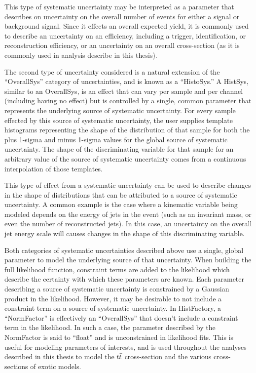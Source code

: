 This type of systematic uncertainty may be interpreted as a parameter that describes on uncertainty on the overall number of events for either a signal or background signal.
Since it effects an overall expected yield, it is commonly used to describe an uncertainty on an efficiency, including a trigger, identification, or reconstruction efficiency, or an uncertainty on an overall cross-section (as it is commonly used in analysis describe in this thesis).

The second type of uncertainty considered is a natural extension of the ``OverallSys'' category of uncertainties, and is known as a ``HistoSys.''
A HistSys, similar to an OverallSys, is an effect that can vary per sample and per channel (including having no effect) but is controlled by a single, common parameter
that represents the underlying source of systematic uncertainty.
For every sample effected by this source of systematic uncertainty, the user supplies template histograms representing the shape of the distribution of that sample for both the plus 1-sigma and minus 1-sigma values for the global source of systematic uncertainty.
The shape of the discriminating variable for that sample for an arbitrary value of the source of systematic uncertainty comes from a continuous interpolation of those templates.

This type of effect from a systematic uncertainty can be used to describe changes in the shape of distributions that can be attributed to a source of systematic uncertainty.
A common example is the case where a kinematic variable being modeled depends on the energy of jets in the event (such as an invariant mass, or even the number of reconstructed jets).
In this case, an uncertainty on the overall jet energy scale will causes changes in the shape of this discriminating variable.

Both categories of systematic uncertainties described above use a single, global parameter to model the underlying source of that uncertainty.
When building the full likelihood function, constraint terms are added to the likelihood which describe the certainty with which these parameters are known.
Each parameter describing a source of systematic uncertainty is constrained by a Gaussian product in the likelihood.
However, it may be desirable to not include a constraint term on a source of systematic uncertainty.
In HistFactory, a ``NormFactor'' is effectively an ``OverallSys'' that doesn't include a constraint term in the likelihood.
In such a case, the parameter described by the NormFactor is said to ``float'' and is unconstrained in likelihood fits.
This is useful for modeling parameters of interests, and is used throughout the analyses described in this thesis to model the $t\bar{t}$ cross-section and the various cross-sections of exotic models.

